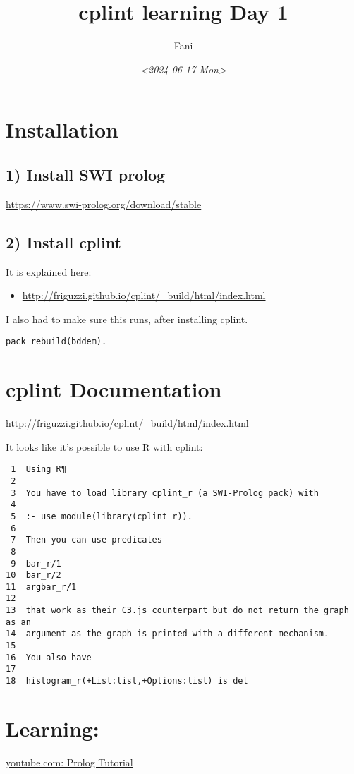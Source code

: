 \documentclass[11pt]{article}
\author{Fani}
\date{\textit{<2024-06-17 Mon>}}
\title{cplint learning Day 1}
\begin{document}
\maketitle

\section{Installation}
\label{sec:orga9c131b}
\subsection{1) Install SWI prolog}
\label{sec:orgf91c2ae}
\url{https://www.swi-prolog.org/download/stable}

\subsection{2) Install cplint}
\label{sec:org21b7812}
It is explained here:
\begin{itemize}
\item \url{http://friguzzi.github.io/cplint/\_build/html/index.html}
\end{itemize}

I also had to make sure this runs, after installing cplint.

\begin{verbatim}
pack_rebuild(bddem).
\end{verbatim}

\section{cplint Documentation}
\label{sec:org4017117}
\url{http://friguzzi.github.io/cplint/\_build/html/index.html}

It looks like it's possible to use R with cplint:

\begin{verbatim}
 1  Using R¶
 2  
 3  You have to load library cplint_r (a SWI-Prolog pack) with
 4  
 5  :- use_module(library(cplint_r)).
 6  
 7  Then you can use predicates
 8  
 9  bar_r/1
10  bar_r/2
11  argbar_r/1
12  
13  that work as their C3.js counterpart but do not return the graph as an
14  argument as the graph is printed with a different mechanism.
15  
16  You also have
17  
18  histogram_r(+List:list,+Options:list) is det
\end{verbatim}

\section{Learning:}
\label{sec:org01342f2}
\href{https://www.youtube.com/watch?v=SykxWpFwMGs\&pp=ygUSZGVyZWsgYmFuYXMgcHJvbG9n}{youtube.com: Prolog Tutorial}
\end{document}
